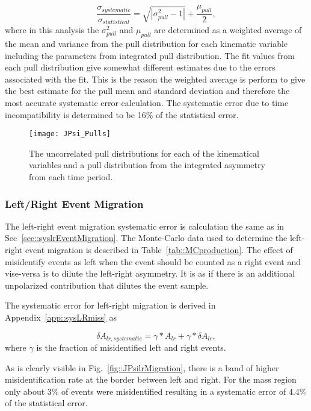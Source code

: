 \begin{equation}
  \label{equ::sysErrorPullJPsi}
  \frac{\sigma_{systematic}}{\sigma_{statistical}} =
  \sqrt{|\sigma^2_{pull} - 1|} + \frac{\mu_{pull}}{2},
\end{equation}
\noindent
where in this analysis the $\sigma_{pull}^2$ and $\mu_{pull}$ are determined as
a weighted average of the mean and variance from the pull distribution for each
kinematic variable including the parameters from integrated pull distribution.
The fit values from each pull distribution give somewhat different estimates due
to the errors associated with the fit.  This is the reason the weighted average
is perform to give the best estimate for the pull mean and standard deviation
and therefore the most accurate systematic error calculation.  The systematic
error due to time incompatibility is determined to be 16\% of the statistical
error.

\begin{figure}[h!t]
  \centering \texttt{[image: JPsi\_Pulls]}
  \caption{The uncorrelated pull distributions for each of the kinematical
    variables and a pull distribution from the integrated asymmetry from each
    time period.}
  \label{fig::JPsi_Pulls}
\end{figure}


\subsubsection{Left/Right Event Migration}
The left-right event migration systematic error is calculation the same as in
Sec~\ref{sec::syslrEventMigration}.  The Monte-Carlo data used to determine the
left-right event migration is described in Table~\ref{tab::MCproduction}.  The
effect of misidentify events as left when the event should be counted as a right
event and vise-versa is to dilute the left-right asymmetry.  It is as if there
is an additional unpolarized contribution that dilutes the event sample.

The systematic error for left-right migration is derived in
Appendix~\ref{app::sysLRmiss} as

\begin{equation}
  \delta A_{lr,systematic} = \gamma *A_{lr} + \gamma *\delta A_{lr},
\end{equation}
\noindent
where $\gamma$ is the fraction of misidentified left and right events.  

As is clearly visible in Fig.~\ref{fig::JPsilrMigration}, there is a band of
higher misidentification rate at the border between left and right.  For the
{\jp} mass region only about 3\% of events were misidentified resulting in a
systematic error of 4.4\% of the statistical error.

